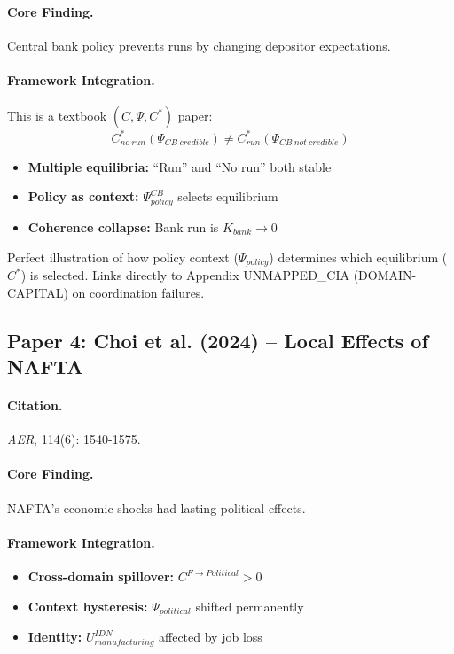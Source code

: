\paragraph{Core Finding.}
Central bank policy prevents runs by changing depositor expectations.

\paragraph{Framework Integration.}
This is a textbook $(C, \Psi, C^*)$ paper:
\begin{equation}
  C^*_{no\ run}(\Psi_{CB\ credible}) \neq C^*_{run}(\Psi_{CB\ not\ credible})
\end{equation}
\begin{itemize}
  \item \textbf{Multiple equilibria:} ``Run'' and ``No run'' both stable
  \item \textbf{Policy as context:} $\Psi_{policy}^{CB}$ selects equilibrium
  \item \textbf{Coherence collapse:} Bank run is $K_{bank} \to 0$
\end{itemize}

\begin{tcolorbox}[colback=yellow!5!white, colframe=yellow!75!black,
    title=EBF Insight: Bank Runs]
Perfect illustration of how policy context ($\Psi_{policy}$) determines
which equilibrium ($C^*$) is selected. Links directly to Appendix UNMAPPED_CIA
(DOMAIN-CAPITAL) on coordination failures.
\end{tcolorbox}


\subsection{Paper 4: Choi et al. (2024) -- Local Effects of NAFTA}

\paragraph{Citation.}
\emph{AER}, 114(6): 1540-1575.

\paragraph{Core Finding.}
NAFTA's economic shocks had lasting political effects.

\paragraph{Framework Integration.}
\begin{itemize}
  \item \textbf{Cross-domain spillover:} $C^{F \to Political} > 0$
  \item \textbf{Context hysteresis:} $\Psi_{political}$ shifted permanently
  \item \textbf{Identity:} $U^{IDN}_{manufacturing}$ affected by job loss
\end{itemize}

